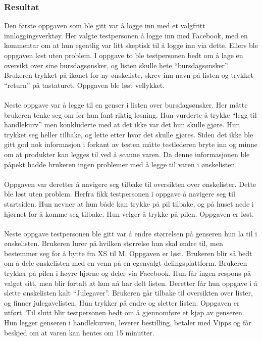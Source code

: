 \subsubsection{Resultat}
Den første oppgaven som ble gitt var å logge inn med et valgfritt innloggingsverktøy. Her valgte testpersonen å logge inn med Facebook, med en kommentar om at hun egentlig var litt skeptisk til å logge inn via dette. Ellers ble oppgaven løst uten problem. 
I oppgave to ble testpersonen bedt om å lage en oversikt over sine bursdagsønsker, og listen skulle hete “bursdagsønsker”. Brukeren trykket på ikonet for ny ønskeliste, skrev inn navn på listen og trykket “return” på tastaturet. Oppgaven ble løst vellykket.
\\\\
Neste oppgave var å legge til en genser i listen over bursdagsønsker. Her måtte brukeren tenke seg om før hun fant riktig løsning. Hun vurderte å trykke “legg til handlekurv” men konkluderte med at det ikke var det hun skulle gjøre. Hun trykket seg heller tilbake, og lette etter hvor det skulle gjøres. Siden det ikke ble gitt god nok informasjon i forkant av testen måtte testlederen bryte inn og minne om at produkter kan legges til ved å scanne varen. Da denne informasjonen ble påpekt hadde brukeren ingen problemer med å legge til varen i ønskelisten.
\\\\
Oppgaven var deretter å navigere seg tilbake til oversikten over ønskelister. Dette ble løst uten problem. Herfra fikk testpersonen i oppgave å navigere seg til startsiden. Hun nevner at hun både kan trykke på pil tilbake, og på huset nede i hjørnet for å komme seg tilbake. Hun velger å trykke på pilen. Oppgaven er løst.
\\\\
Neste oppgave testpersonen ble gitt var å endre størrelsen på genseren hun la til i ønskelisten. Brukeren lurer på hvilken størrelse hun skal endre til, men bestemmer seg for å bytte fra XS til M. Oppgaven er løst. Brukeren blir så bedt om å dele ønskelisten med en venn på en egenvalgt delingsplattform. Brukeren trykker på pilen i høyre hjørne og deler via Facebook. Hun får ingen respons på valget sitt, men blir fortalt at hun nå har delt listen. Deretter får hun oppgave i å slette ønskelisten kalt “Julegaver”. Brukeren går tilbake til oversikten over lister, og finner julegavelisten. Hun trykker på endre og sletter listen. Oppgaven er utført. Til slutt blir testpersonen bedt om å gjennomføre et kjøp av genseren. Hun legger genseren i handlekurven, leverer bestilling, betaler med Vipps og får beskjed om at varen kan hentes om 15 minutter.
